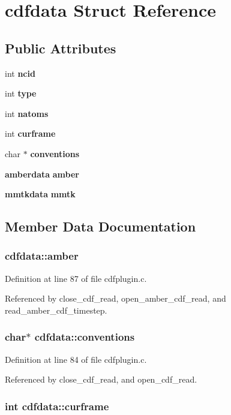 \section{cdfdata  Struct Reference}
\label{structcdfdata}
\subsection*{Public Attributes}
\begin{CompactItemize}
\item 
int {\bf ncid}
\item 
int {\bf type}
\item 
int {\bf natoms}
\item 
int {\bf curframe}
\item 
char $\ast$ {\bf conventions}
\item 
{\bf amberdata} {\bf amber}
\item 
{\bf mmtkdata} {\bf mmtk}
\end{CompactItemize}


\subsection{Member Data Documentation}
\subsubsection{ cdfdata::amber}\label{structcdfdata_m5}




Definition at line 87 of file cdfplugin.c.

Referenced by close\_\-cdf\_\-read, open\_\-amber\_\-cdf\_\-read, and read\_\-amber\_\-cdf\_\-timestep.
\subsubsection{\setlength{\rightskip}{0pt plus 5cm}char$\ast$ cdfdata::conventions}\label{structcdfdata_m4}




Definition at line 84 of file cdfplugin.c.

Referenced by close\_\-cdf\_\-read, and open\_\-cdf\_\-read.
\subsubsection{\setlength{\rightskip}{0pt plus 5cm}int cdfdata::curframe}\label{structcdfdata_m3}




